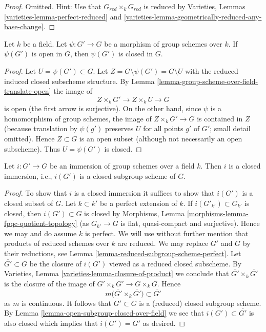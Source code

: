 \begin{proof}
Omitted. Hint: Use that $G_{red} \times_k G_{red}$ is reduced by
Varieties, Lemmas \ref{varieties-lemma-perfect-reduced} and
\ref{varieties-lemma-geometrically-reduced-any-base-change}.
\end{proof}

\begin{lemma}
\label{lemma-open-subgroup-closed-over-field}
Let $k$ be a field. Let $\psi: G' \to G$ be a morphism of group schemes
over $k$. If $\psi(G')$ is open in $G$, then $\psi(G')$ is closed in $G$.
\end{lemma}

\begin{proof}
Let $U = \psi(G') \subset G$. Let $Z = G \setminus \psi(G') = G \setminus U$
with the reduced induced closed subscheme structure. By
Lemma \ref{lemma-group-scheme-over-field-translate-open}
the image of
$$
Z \times_k G' \longrightarrow
Z \times_k U \longrightarrow G
$$
is open (the first arrow is surjective). On the other hand, since $\psi$
is a homomorphism of group schemes, the image of $Z \times_k G' \to G$
is contained in $Z$ (because translation by $\psi(g')$ preserves
$U$ for all points $g'$ of $G'$; small detail omitted).
Hence $Z \subset G$ is an open subset (although not
necessarily an open subscheme). Thus $U = \psi(G')$ is closed.
\end{proof}

\begin{lemma}
\label{lemma-immersion-group-schemes-closed-over-field}
Let $i : G' \to G$ be an immersion of group schemes over a field $k$.
Then $i$ is a closed immersion, i.e., $i(G')$ is a closed subgroup scheme
of $G$.
\end{lemma}

\begin{proof}
To show that $i$ is a closed immersion it suffices to show that
$i(G')$ is a closed subset of $G$. Let $k \subset k'$ be a perfect
extension of $k$. If $i(G'_{k'}) \subset G_{k'}$ is closed, then
$i(G') \subset G$ is closed by
Morphisms, Lemma \ref{morphisms-lemma-fpqc-quotient-topology}
(as $G_{k'} \to G$ is flat, quasi-compact and surjective).
Hence we may and do assume $k$ is perfect. We will use without further
mention that products of reduced schemes over $k$ are reduced.
We may replace $G'$ and $G$ by their reductions, see
Lemma \ref{lemma-reduced-subgroup-scheme-perfect}.
Let $\overline{G'} \subset G$ be the closure of $i(G')$ viewed
as a reduced closed subscheme. By
Varieties, Lemma \ref{varieties-lemma-closure-of-product}
we conclude that $\overline{G'} \times_k \overline{G'}$
is the closure of the image of $G' \times_k G' \to G \times_k G$. Hence
$$
m\Big(\overline{G'} \times_k \overline{G'}\Big)
\subset \overline{G'}
$$
as $m$ is continuous. It follows that $\overline{G'} \subset G$
is a (reduced) closed subgroup scheme. By
Lemma \ref{lemma-open-subgroup-closed-over-field}
we see that $i(G') \subset \overline{G'}$ is also closed
which implies that $i(G') = \overline{G'}$ as desired.
\end{proof}

